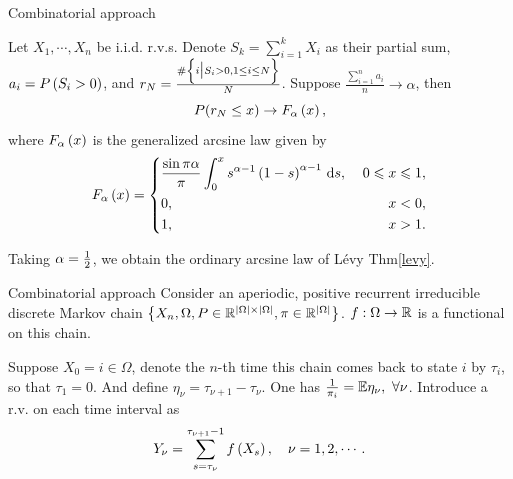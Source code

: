 \documentclass{beamer}
\begin{document}
\begin{frame}{Combinatorial approach}
\small
\begin{Thm}
Let $X_1, \cdots, X_n$ be i.i.d. r.v.s. Denote $S_k = \sum_{i = 1}^k X_i$ as their partial sum, $a_i = P\left( S_i > 0 \right)$, and $r_N = \frac{\#\left\{ i \big| S_i > 0, 1 \leq i \leq N \right\}}{N}$. Suppose $\frac{\sum_{i = 1}^n a_i}{n} \rightarrow \alpha$, then
\begin{equation}
P(r_N \leq x) \rightarrow  F_{\alpha}\left( x \right),
\end{equation}
where $F_{\alpha}\left( x \right)$ is the generalized arcsine law given by
\begin{equation}
    F_{\alpha}\left( x \right) = \left\{ 
    \begin{aligned}
        & \frac{\sin \pi \alpha}{\pi} \int_{0}^x s^{\alpha - 1}\left( 1 - s \right)^{\alpha - 1} \, \mathrm{d} s, \; & 0 \leqslant x \leqslant 1, \\
        & 0, & x < 0,       \\
        & 1, & x > 1.
    \end{aligned}\right.
\end{equation}
\end{Thm}
\begin{Rem}
    Taking $\alpha = \frac{1}{2}$, we obtain the ordinary arcsine law of L\'evy Thm\eqref{levy}.
\end{Rem}


\end{frame}


\begin{frame}{ Combinatorial approach}
Consider an aperiodic, positive recurrent irreducible discrete Markov chain $\left\{ X_n, \Omega, P \in \mathbb{R}^{\left| \Omega \right| \times \left| \Omega \right|}, \pi \in \mathbb{R}^{\left| \Omega \right|} \right\}$. $f: \Omega \rightarrow \mathbb{R}$ is a functional on this chain. 
\par
Suppose $X_0 = i \in \Omega$, denote the $n$-th time this chain comes back to state $i$ by $\tau_i$, so that $\tau_1 = 0$. And define $\eta_{\nu} = \tau_{\nu + 1} - \tau_{\nu}$. One has $\frac{1}{\pi_i} = \mbE\eta_{\nu}, \ \forall \nu$. Introduce a r.v. on each time interval as
\begin{equation}
    Y_{\nu} = \sum_{s = \tau_{\nu}}^{\tau_{\nu + 1} - 1} f\left( X_s \right), \quad \nu = 1, 2, \cdots.
\end{equation}
\end{frame}
\end{document}
